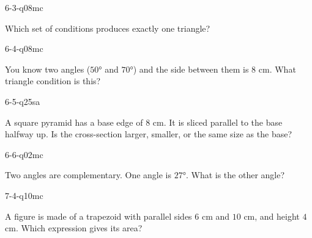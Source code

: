 \begin{practiceQuestion}{6-3-q08}{mc}
\begin{questionText}
Which set of conditions produces exactly one triangle?
\end{questionText}
\end{practiceQuestion}

\begin{practiceQuestion}{6-4-q08}{mc}
\begin{questionText}
You know two angles ($50°$ and $70°$) and the side between them is $8$ cm. What triangle condition is this?
\end{questionText}
\end{practiceQuestion}

\begin{practiceQuestion}{6-5-q25}{sa}
\begin{questionText}
A square pyramid has a base edge of $8$ cm. It is sliced parallel to the base halfway up. Is the cross-section larger, smaller, or the same size as the base?
\end{questionText}
\end{practiceQuestion}

\begin{practiceQuestion}{6-6-q02}{mc}
\begin{questionText}
Two angles are complementary. One angle is $27°$. What is the other angle?
\end{questionText}
\end{practiceQuestion}

\begin{practiceQuestion}{7-4-q10}{mc}
\begin{questionText}
A figure is made of a trapezoid with parallel sides $6$ cm and $10$ cm, and height $4$ cm. Which expression gives its area?
\end{questionText}
\end{practiceQuestion}

